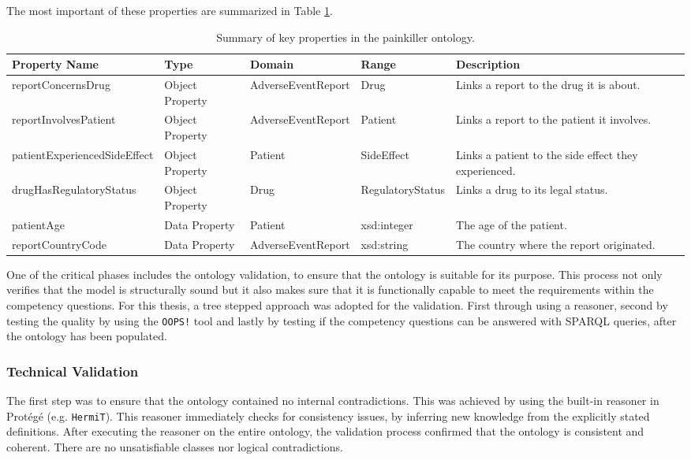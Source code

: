 The most important of these properties are summarized in Table \ref{tab:ontology_properties}.

\begin{table}[htbp]
\centering
\small
\begin{tabular}{|p{2.6cm}|p{1.8cm}|p{1.8cm}|p{1.8cm}|p{3.0cm}|}
\hline
\textbf{Property Name} & \textbf{Type} & \textbf{Domain} & \textbf{Range} & \textbf{Description} \\
\hline
report\-Concerns\-Drug & Object Property & Adverse\-Event\-Report & Drug & Links a report to the drug it is about. \\
\hline
report\-Involves\-Patient & Object Property & Adverse\-Event\-Report & Patient & Links a report to the patient it involves. \\
\hline
patient\-Experienced\-Side\-Effect & Object Property & Patient & Side\-Effect & Links a patient to the side effect they experienced. \\
\hline
drug\-Has\-Regulatory\-Status & Object Property & Drug & Regulatory\-Status & Links a drug to its legal status. \\
\hline
patientAge & Data Property & Patient & xsd:integer & The age of the patient. \\
\hline
report\-Country\-Code & Data Property & Adverse\-Event\-Report & xsd:string & The country where the report originated. \\
\hline
\end{tabular}
\caption{Summary of key properties in the painkiller ontology.}
\label{tab:ontology_properties}
\end{table}

One of the critical phases includes the ontology validation, to ensure that the ontology is suitable for its purpose. This process not only verifies that the model is structurally sound but it also makes sure that it is functionally capable to meet the requirements within the competency questions. For this thesis, a tree stepped approach was adopted for the validation. First through using a reasoner, second by testing the quality by using the \texttt{OOPS!} tool and lastly by testing if the competency questions can be answered with SPARQL queries, after the ontology has been populated.
\subsubsection*{Technical Validation}
The first step was to ensure that the ontology contained no internal contradictions. This was achieved by using the built-in reasoner in Protégé (e.g. \texttt{HermiT}). This reasoner immediately checks for consistency issues, by inferring new knowledge from the explicitly stated definitions. After executing the reasoner on the entire ontology, the validation process confirmed that the ontology is consistent and coherent. There are no unsatisfiable classes nor logical contradictions.

